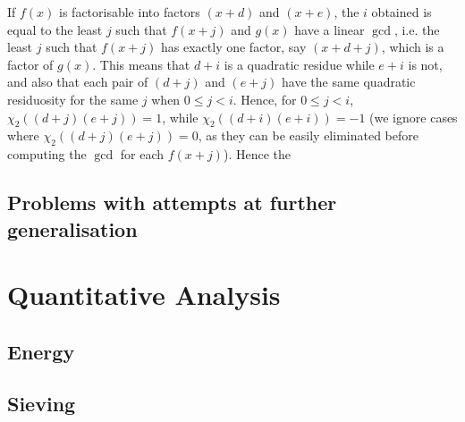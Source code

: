 \documentclass{report}
\begin{document}
If $f(x)$ is factorisable into factors $(x+d)$ and $(x+e)$, the $i$ obtained is equal to the least $j$ such that $f(x+j)$ and $g(x)$ have a linear $\gcd$, i.e. the least $j$ such that $f(x+j)$ has exactly one factor, say $(x+d+j)$, which is a factor of  $g(x)$. This means that $d+i$ is a quadratic residue while $e+i$ is not, and also that each pair of $(d+j)$ and $(e+j)$ have the same quadratic residuosity for the same $j$ when $0\leq j<i$. Hence, for $0\leq j<i$, $\chi_2((d+j)(e+j))=1$, while $\chi_2((d+i)(e+i))=-1$ (we ignore cases where $\chi_2((d+j)(e+j))=0$, as they can be easily eliminated before computing the $\gcd$ for each $f(x+j)$). Hence the 
%
%
\section{}
%

%
%
%
%
\section{Problems with attempts at further generalisation}
%
\chapter{Quantitative Analysis}
\section{Energy}
%
%
\section{Sieving}
%
%
\end{document}
